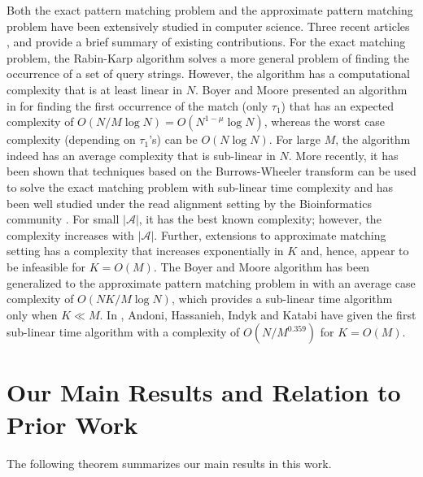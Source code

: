 Both the exact pattern matching problem and the approximate pattern matching problem have been extensively studied in computer science.
Three recent articles \cite{andoni2013shift}, \cite{amir2004faster} and \cite{navarro2001guided} provide a brief summary of existing contributions.
For the exact matching problem, the Rabin-Karp algorithm solves a more general problem of finding the occurrence of a set of query strings.
However, the algorithm has a computational complexity that is at least linear in $N$. Boyer and Moore presented an algorithm in \cite{boyer1977fast} for finding the first occurrence of the match (only $\tau_1$) that has an expected complexity of $O(N/M \log N) = O(N^{1-\mu} \log N)$, whereas the worst case complexity (depending on $\tau_1$'s) can be $O(N \log N)$. For large $M$, the algorithm indeed has an average complexity that is sub-linear in $N$. More recently, it has been shown that techniques based on the Burrows-Wheeler transform can be used to solve the exact matching problem with sub-linear time complexity \cite{ferragina2005indexing} and has been well studied under the read alignment setting by the Bioinformatics community \cite{li2009fast,li2010fast}. For small $|\mathcal{A}|$, it has the best known complexity; however, the complexity increases with $|\mathcal{A}|$. Further, extensions to approximate matching setting \cite{zhang2003approximate} has a complexity that increases exponentially in $K$ and, hence, appear to be infeasible for $K = O(M)$. The Boyer and Moore algorithm has been generalized to the approximate pattern matching problem in \cite{chang1994approximate} with an average case complexity of $O(NK/M \log N)$, which provides a sub-linear time algorithm only when $K \ll M$. In \cite{andoni2013shift}, Andoni, Hassanieh, Indyk and Katabi have given the first sub-linear time algorithm with a complexity of $O(N/M^{0.359})$ for $K = O(M)$.

\section{Our Main Results and Relation to Prior Work}
\label{sec:mainresults}
The following theorem summarizes our main results in this work.

